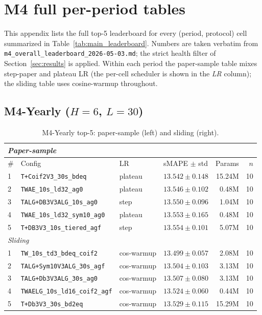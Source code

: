 \documentclass[11pt,a4paper]{article}
\begin{document}
\section{M4 full per-period tables}
\label{app:m4_tables}

This appendix lists the full top-5 leaderboard for every (period, protocol) cell summarized in Table~\ref{tab:main_leaderboard}. Numbers are taken verbatim from \texttt{m4\_overall\_leaderboard\_2026-05-03.md}; the strict health filter of Section~\ref{sec:results} is applied. Within each period the paper-sample table mixes step-paper and plateau LR (the per-cell scheduler is shown in the \emph{LR} column); the sliding table uses cosine-warmup throughout.

\subsection{\texorpdfstring{M4-Yearly ($H=6$, $L=30$)}{M4-Yearly (H=6, L=30)}}

\begin{table}[h]
\centering
\scriptsize
\setlength{\tabcolsep}{2.5pt}
\caption{M4-Yearly top-5: paper-sample (left) and sliding (right).}
\label{tab:m4_yearly_full}
\begin{tabular}{@{}llllrr@{}}
\toprule
\multicolumn{6}{l}{\textit{Paper-sample}} \\
\midrule
\# & Config & LR & sMAPE $\pm$ std & Params & $n$ \\
\midrule
1 & \texttt{T+Coif2V3\_30s\_bdeq}           & plateau & $\mathbf{13.542 \pm 0.148}$ & 15.24M & 10 \\
2 & \texttt{TWAE\_10s\_ld32\_ag0}           & plateau & $13.546 \pm 0.102$          & 0.48M  & 10 \\
3 & \texttt{TALG+DB3V3ALG\_10s\_ag0}        & step    & $13.550 \pm 0.096$          & 1.04M  & 10 \\
4 & \texttt{TWAE\_10s\_ld32\_sym10\_ag0}    & plateau & $13.553 \pm 0.165$          & 0.48M  & 10 \\
5 & \texttt{T+DB3V3\_10s\_tiered\_agf}      & step    & $13.554 \pm 0.101$          & 5.07M  & 10 \\
\midrule
\multicolumn{6}{l}{\textit{Sliding}} \\
\midrule
1 & \texttt{TW\_10s\_td3\_bdeq\_coif2}      & cos-warmup & $\mathbf{13.499 \pm 0.057}$ & 2.08M  & 10 \\
2 & \texttt{TALG+Sym10V3ALG\_30s\_agf}      & cos-warmup & $13.504 \pm 0.103$          & 3.13M  & 10 \\
3 & \texttt{TALG+Db3V3ALG\_30s\_ag0}        & cos-warmup & $13.507 \pm 0.080$          & 3.13M  & 10 \\
4 & \texttt{TWAELG\_10s\_ld16\_coif2\_agf}  & cos-warmup & $13.524 \pm 0.060$          & 0.44M  & 10 \\
5 & \texttt{T+Db3V3\_30s\_bd2eq}            & cos-warmup & $13.529 \pm 0.115$          & 15.29M & 10 \\
\bottomrule
\end{tabular}
\end{table}
\end{document}
